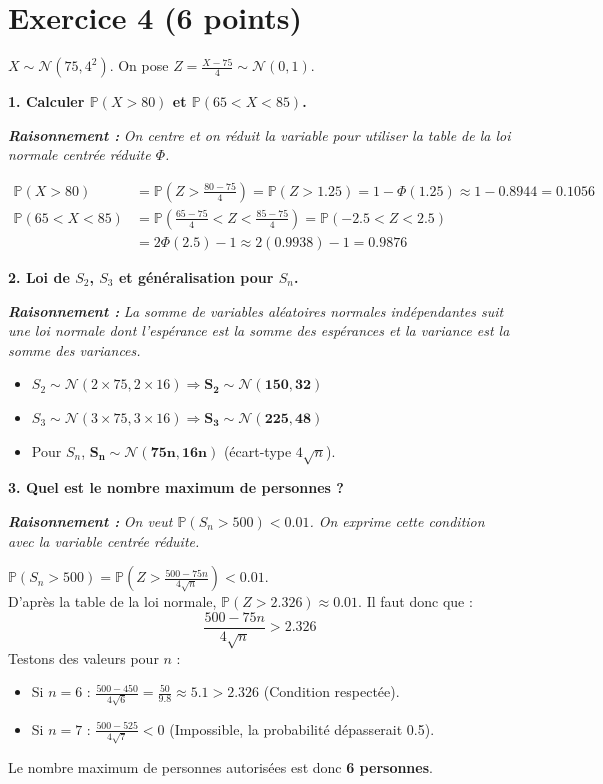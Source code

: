 \documentclass[11pt,a4paper]{article}
\newcommand{\raisonnement}[1]{
    \vspace{0.2cm}
    \noindent\textcolor{blue!70!black}{
        \textbf{\textit{Raisonnement : }} \textit{#1}
    }
    \vspace{0.2cm}
}
\begin{document}
\vspace{0.5cm}
\section*{Exercice 4 (6 points)}

$X \sim \mathcal{N}(75, 4^2)$. On pose $Z = \frac{X-75}{4} \sim \mathcal{N}(0,1)$.

\textbf{1. Calculer $\mathbb{P}(X>80)$ et $\mathbb{P}(65<X<85)$.}
\raisonnement{On centre et on réduit la variable pour utiliser la table de la loi normale centrée réduite $\Phi$.}
\begin{align*}
\mathbb{P}(X > 80) &= \mathbb{P}\left(Z > \frac{80-75}{4}\right) = \mathbb{P}(Z > 1.25) = 1 - \Phi(1.25) \approx 1 - 0.8944 = \mathbf{0.1056} \\
\mathbb{P}(65 < X < 85) &= \mathbb{P}\left(\frac{65-75}{4} < Z < \frac{85-75}{4}\right) = \mathbb{P}(-2.5 < Z < 2.5) \\
&= 2\Phi(2.5) - 1 \approx 2(0.9938) - 1 = \mathbf{0.9876}
\end{align*}

\textbf{2. Loi de $S_2$, $S_3$ et généralisation pour $S_n$.}
\raisonnement{La somme de variables aléatoires normales indépendantes suit une loi normale dont l'espérance est la somme des espérances et la variance est la somme des variances.}
\begin{itemize}
    \item $S_2 \sim \mathcal{N}(2 \times 75, 2 \times 16) \Rightarrow \mathbf{S_2 \sim \mathcal{N}(150, 32)}$
    \item $S_3 \sim \mathcal{N}(3 \times 75, 3 \times 16) \Rightarrow \mathbf{S_3 \sim \mathcal{N}(225, 48)}$
    \item Pour $S_n$, $\mathbf{S_n \sim \mathcal{N}(75n, 16n)}$ (écart-type $4\sqrt{n}$).
\end{itemize}

\textbf{3. Quel est le nombre maximum de personnes ?}
\raisonnement{On veut $\mathbb{P}(S_n > 500) < 0.01$. On exprime cette condition avec la variable centrée réduite.}
$\mathbb{P}(S_n > 500) = \mathbb{P}\left(Z > \frac{500 - 75n}{4\sqrt{n}}\right) < 0.01$. \\
D'après la table de la loi normale, $\mathbb{P}(Z > 2.326) \approx 0.01$. Il faut donc que :
$$ \frac{500 - 75n}{4\sqrt{n}} > 2.326 $$
Testons des valeurs pour $n$ :
\begin{itemize}
    \item Si $n=6$ : $\frac{500 - 450}{4\sqrt{6}} = \frac{50}{9.8} \approx 5.1 > 2.326$ (Condition respectée).
    \item Si $n=7$ : $\frac{500 - 525}{4\sqrt{7}} < 0$ (Impossible, la probabilité dépasserait 0.5).
\end{itemize}
Le nombre maximum de personnes autorisées est donc \textbf{6 personnes}.
\end{document}
